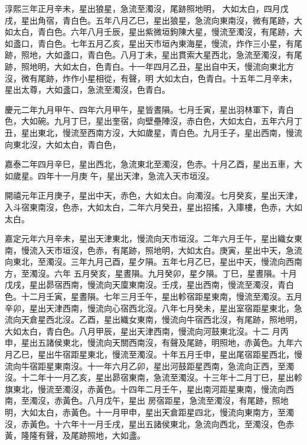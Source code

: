 \begin{pinyinscope}
 淳熙三年正月辛未，星出狼星，急流至濁沒，尾跡照地明，
 大如太白，四月戊戌，星出角宿，青白色。五年八月乙巳，星出狼星，急流向東南沒，微有尾跡，大如太白，青白色。六年八月壬辰，星出紫微垣鉤陳大星，慢流至濁沒，有尾跡，大如盞口，青白色。七年五月乙亥，星出天市垣內東海星，慢流，炸作三小星，有尾跡，照地，大如盞口，青白色。八月丁未，星出貫索大星西北，急流至濁沒，有尾跡，照地明，大如太白，色青白。十一年四月乙丑，星出自中天，慢流向東北方沒，微有尾跡，炸作小星相從，有聲，明
 大如太白，色青白。十五年二月辛未，星出太尊，大如盞口，急流至濁沒，色青白。



 慶元二年九月甲午、四年六月甲午，星皆晝隕。七月壬寅，星出羽林軍下，青白色，大如碗。九月丁巳，星出奎宿，向壁壘陣沒，赤白色，大如太白，五年六月丁丑，星出東北，慢流至西南方沒，大如歲星，青白色。九月壬子，星出西南，慢流向東北沒，大如太白，青白色，



 嘉泰二年四月辛巳，星出西北，急流東北至濁沒，色赤。十月乙酉，星出五車，大如歲星。四年十一月庚
 午，星出天津，急流入天市垣沒。



 開禧元年正月庚子，星出中天，赤色，大如太白。向濁沒。七月癸亥，星出天津，入斗宿東南沒，色赤，大如太白，二年六月癸丑，星出招搖，入庫樓，色赤，大如太白。



 嘉定元年六月辛未，星出天津東北，慢流向天市垣沒。二年六月壬午，星出織女東南，慢流入天市垣沒，色赤，有尾跡，照地明，大如太白。庚寅，星出中天，急流向東北，至濁沒。三年九月己酉，星夕隕。五年七月乙巳，星出中天，慢流向西南方，至濁沒。六年
 五月癸亥，星晝隕。九月癸卯，星夕隕。丁巳，星晝隕。十月戊戌，星出昴宿西南，慢流向天廩東南沒。壬戌，星出西南，慢流至濁沒，青白色。十二月壬寅，星晝隕。七年三月壬午，星出軫宿距星東南，慢流至濁沒。五月辛卯，星出天津西南，慢流向心宿西北沒。八年七月癸未，星出室宿距星東北，急流向天倉星西北沒。乙酉，星出織女東南，慢流向牛宿西北沒，有尾跡，照地明，大如太白，青白色。八月甲辰，星出天津西南，慢流向河鼓東北沒。十二
 月丙申，星出五諸侯東北，慢流向天關西南沒，有聲及尾跡，明照地，赤黃色。九年六月乙巳，星出牛宿距星東北，慢流至濁沒。十年五月壬申，星出尾宿距星西北，慢流向牛宿距星東南沒。十一年六月乙卯，星出河鼓距星西南，急流向正西，至濁沒。十二年十一月乙亥，星出昴宿東南，急流至濁沒。十三年十二月丁巳，星出軫旗東北，慢流至濁沒，赤黃色。十四年二月壬午，星出南河距星東南，慢流向西南，至濁沒，赤黃色。八月戊午，星出
 房宿距星，急流至濁沒，有尾跡，照地明，大如太白，赤黃色。十一月甲申，星出天倉距星四北，慢流向東南方，至濁沒，赤黃色。十六年十一月壬戌，星出五諸侯東北，急流向西北，至濁沒，色赤黃，隆隆有聲，及尾跡照地，大如盞。




\end{pinyinscope}
